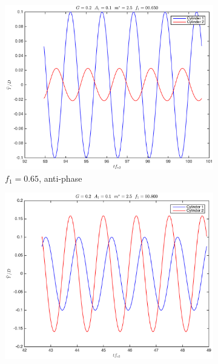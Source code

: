\begin{figure}[tbp]	
	\newcommand\widthp{0.5}
	\centering
	\captionsetup{justification=centering}
	\hspace*{\fill}%
	\begin{subfigure}[t]{\widthp\textwidth}
		\centering
		\includegraphics[width=1\linewidth]{Figs/Plotting_g0.20a0.100m2.5zl_r48_00.650_VIV02}
		\caption{$ f_1=0.65 $, anti-phase}
		\label{fig:freq0.65}
	\end{subfigure}%
	\begin{subfigure}[t]{\widthp\textwidth}
		\centering
		\includegraphics[width=1\linewidth]{Figs/Plotting_g0.20a0.100m2.5zl_r48_00.800_VIV02}

\end{subfigure}
\end{figure}
